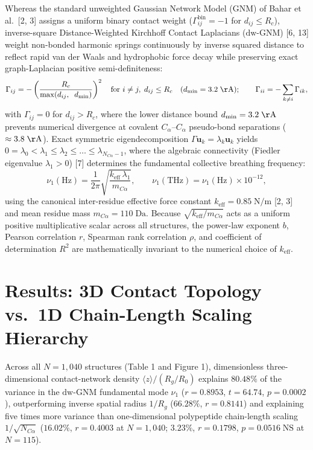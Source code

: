 \documentclass[11pt,onecolumn,letterpaper]{article}
\begin{document}
Whereas the standard unweighted Gaussian Network Model (GNM) of Bahar et al.\ [2, 3] assigns a uniform binary contact weight ($\Gamma_{ij}^{\mathrm{bin}} = -1$ for $d_{ij} \le R_c$), inverse-square Distance-Weighted Kirchhoff Contact Laplacians ($\mathrm{dw\text{-}GNM}$) [6, 13] weight non-bonded harmonic springs continuously by inverse squared distance to reflect rapid van der Waals and hydrophobic force decay while preserving exact graph-Laplacian positive semi-definiteness:
\begin{equation}
\Gamma_{ij} = -\left(\frac{R_c}{\max(d_{ij},\;\; d_{\min})}\right)^2 \quad \text{for } i \neq j,\; d_{ij} \le R_c \quad (d_{\min} = 3.2\;\mathrm{\AA}); \qquad \Gamma_{ii} = -\sum_{k \neq i} \Gamma_{ik},
\end{equation}
with $\Gamma_{ij} = 0$ for $d_{ij} > R_c$, where the lower distance bound $d_{\min} = 3.2\;\mathrm{\AA}$ prevents numerical divergence at covalent $C_\alpha$--$C_\alpha$ pseudo-bond separations ($\approx 3.8\;\mathrm{\AA}$). Exact symmetric eigendecomposition $\Gamma \mathbf{u}_k = \lambda_k \mathbf{u}_k$ yields $0 = \lambda_0 < \lambda_1 \le \lambda_2 \le \dots \le \lambda_{N_{C\alpha}-1}$, where the algebraic connectivity (Fiedler eigenvalue $\lambda_1 > 0$) [7] determines the fundamental collective breathing frequency:
\begin{equation}
\nu_1(\mathrm{Hz}) = \frac{1}{2\pi}\sqrt{\frac{k_{\mathrm{eff}}\,\lambda_1}{m_{C\alpha}}}, \qquad \nu_1(\mathrm{THz}) = \nu_1(\mathrm{Hz}) \times 10^{-12},
\end{equation}
using the canonical inter-residue effective force constant $k_{\mathrm{eff}} = 0.85\;\mathrm{N/m}$ [2, 3] and mean residue mass $m_{C\alpha} = 110\;\mathrm{Da}$. Because $\sqrt{k_{\mathrm{eff}} / m_{C\alpha}}$ acts as a uniform positive multiplicative scalar across all structures, the power-law exponent $b$, Pearson correlation $r$, Spearman rank correlation $\rho$, and coefficient of determination $R^2$ are mathematically invariant to the numerical choice of $k_{\mathrm{eff}}$.

\section{Results: 3D Contact Topology vs.\ 1D Chain-Length Scaling Hierarchy}
Across all $N = 1,040$ structures (Table 1 and Figure 1), dimensionless three-dimensional contact-network density $\langle z \rangle / (R_g / R_0)$ explains $80.48\%$ of the variance in the $\mathrm{dw\text{-}GNM}$ fundamental mode $\nu_1$ ($r = 0.8953$, $t = 64.74$, $p = 0.0002$), outperforming inverse spatial radius $1/R_g$ ($66.28\%$, $r = 0.8141$) and explaining five times more variance than one-dimensional polypeptide chain-length scaling $1/\sqrt{N_{C\alpha}}$ ($16.02\%$, $r = 0.4003$ at $N = 1,040$; $3.23\%$, $r = 0.1798$, $p = 0.0516\;\mathrm{NS}$ at $N = 115$).
\end{document}
